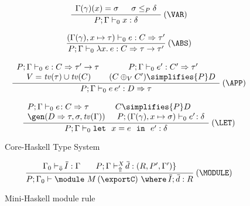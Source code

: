 \begin{figure}
\[ \begin{array}{cc}
      \displaystyle\frac
        {\begin{array}[t]{lll}
           \Gamma(\gamma)(x) = \sigma\ & \:\sigma \leq_P \delta
         \end{array}}
        {P;\Gamma \vdash_0 x: \delta} \:(\VAR) \\ \\

	\displaystyle\frac
          {(\Gamma(\gamma),x \mapsto \tau) \vdash_0 e: C \Rightarrow \tau'}
	  {P;\Gamma \vdash_0 \lambda x.\:e: C\Rightarrow \tau \rightarrow \tau'} \:(\ABS)  \\ \\

	\displaystyle\frac
	  {\begin{array}[t]{cc}
             P;\Gamma \vdash_0 e: C \Rightarrow \tau' \rightarrow \tau\: &\:
             P;\Gamma \vdash_0 e': C' \Rightarrow \tau' \\
             V = \tv(\tau) \cup \tv(C) & (C \oplus_V C') \simplifies{P} D
           \end{array}}
	{P;\Gamma \vdash_0 e\:e': D\Rightarrow \tau} \:(\APP) \\ \\

	\displaystyle\frac
	 {\begin{array}{ll}
            P;\Gamma \vdash_0 e\!:C \Rightarrow \tau & C \simplifies{P} D\\
             \gen(D\Rightarrow \tau,\sigma,\tv(\Gamma))\: & \:P;(\Gamma(\gamma),x \mapsto\sigma) \vdash_0 e'\!:\delta
          \end{array}}
	 {P;\Gamma \vdash_0 \mlet\ x=e\ \iin\ e':\delta} \:(\LET)
\end{array} \]
\caption{Core-Haskell Type System}
\label{fig:core-haskell-type-system}
\end{figure}

\begin{figure}
\[ \begin{array}{cc}
	\displaystyle\frac
	 {\begin{array}{ll}
           \Gamma_0 \vdash_{\Downarrow} \overline{\!I} : \Gamma\:\: & \:\:P;\Gamma \vdash_{\Uparrow}^X \overline{\!d} : (R,P',\Gamma') \}
          \end{array}}
	 {P;\Gamma_0 \vdash \module\ M\, (\exportC)\ \where\ \overline{\!I};\, \overline{\!d} : R} \:(\MODULE)
\end{array} \]
\caption{Mini-Haskell module rule} 
\label{fig:mini-haskell-module-rule}
\end{figure}

